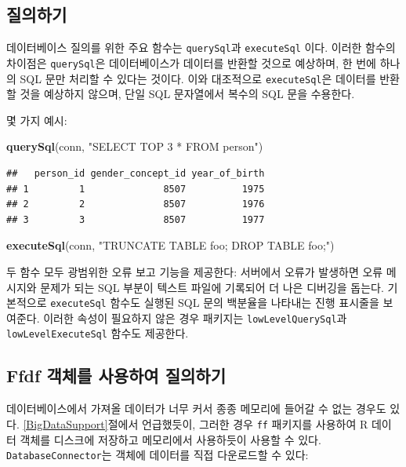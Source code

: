 \documentclass[10.5pt]{book}
\newenvironment{Shaded}{\begin{snugshade}}{\end{snugshade}}
\newcommand{\KeywordTok}[1]{\textcolor[rgb]{0.13,0.29,0.53}{\textbf{#1}}}
\newcommand{\StringTok}[1]{\textcolor[rgb]{0.31,0.60,0.02}{#1}}
\newcommand{\NormalTok}[1]{#1}
\theoremstyle{definition}
\theoremstyle{definition}
\theoremstyle{definition}
\theoremstyle{remark}
\begin{document}
\subsection{질의하기}

데이터베이스 질의를 위한 주요 함수는 \texttt{querySql}과
\texttt{executeSql} 이다. 이러한 함수의 차이점은 \texttt{querySql}은
데이터베이스가 데이터를 반환할 것으로 예상하며, 한 번에 하나의 SQL 문만
처리할 수 있다는 것이다. 이와 대조적으로 \texttt{executeSql}은 데이터를
반환할 것을 예상하지 않으며, 단일 SQL 문자열에서 복수의 SQL 문을
수용한다. 

몇 가지 예시:

\begin{Shaded}
\begin{Highlighting}[]
\KeywordTok{querySql}\NormalTok{(conn, }\StringTok{"SELECT TOP 3 * FROM person"}\NormalTok{)}
\end{Highlighting}
\end{Shaded}

\begin{verbatim}
##   person_id gender_concept_id year_of_birth
## 1         1              8507          1975
## 2         2              8507          1976
## 3         3              8507          1977
\end{verbatim}

\begin{Shaded}
\begin{Highlighting}[]
\KeywordTok{executeSql}\NormalTok{(conn, }\StringTok{"TRUNCATE TABLE foo; DROP TABLE foo;"}\NormalTok{)}
\end{Highlighting}
\end{Shaded}

두 함수 모두 광범위한 오류 보고 기능을 제공한다: 서버에서 오류가
발생하면 오류 메시지와 문제가 되는 SQL 부분이 텍스트 파일에 기록되어 더
나은 디버깅을 돕는다. 기본적으로 \texttt{executeSql} 함수도 실행된 SQL
문의 백분율을 나타내는 진행 표시줄을 보여준다. 이러한 속성이 필요하지
않은 경우 패키지는 \texttt{lowLevelQuerySql}과
\texttt{lowLevelExecuteSql} 함수도 제공한다.

\subsection{Ffdf 객체를 사용하여 질의하기}\label{ffdf---}

데이터베이스에서 가져올 데이터가 너무 커서 종종 메모리에 들어갈 수 없는
경우도 있다. \ref{BigDataSupport}절에서 언급했듯이, 그러한 경우
\texttt{ff} 패키지를 사용하여 R 데이터 객체를 디스크에 저장하고
메모리에서 사용하듯이 사용할 수 있다. \texttt{DatabaseConnector}는
객체에 데이터를 직접 다운로드할 수 있다:
\end{document}
